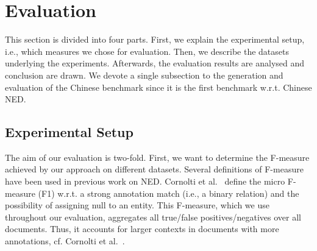 

\section{Evaluation}
\label{sec:eval}

This section is divided into four parts. 
First, we explain the experimental setup, i.e., which measures we chose for evaluation.
Then, we describe the datasets underlying the experiments. 
Afterwards, the evaluation results are analysed and conclusion are drawn. 
We devote a single subsection to the generation and evaluation of the Chinese benchmark since it is the first benchmark w.r.t. Chinese \ac{NED}.

\subsection{Experimental Setup}
\label{eval}
The aim of our evaluation is two-fold.
First, we want  to determine the F-measure achieved by our approach on different datasets.
Several definitions of F-measure have been used in previous work on \ac{NED}.
Cornolti et al.~\cite{cornolti} define the micro F-measure (F1) w.r.t. a strong annotation match (i.e., a binary relation) and the possibility of assigning null to an entity.
This F-measure, which we use throughout our evaluation, aggregates all true/false positives/negatives over all documents.
Thus, it accounts for larger contexts in documents with more annotations, cf. Cornolti et al.~\cite{cornolti}.

